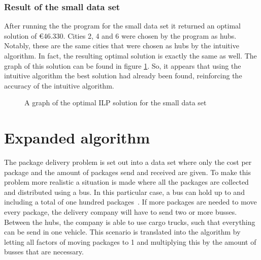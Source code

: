 \documentclass{article}
\begin{document}
\subsubsection{Result of the small data set}
After running the the program for the small data set it returned an optimal solution of €46.330. Cities 2, 4 and 6 were chosen by the program as hubs. Notably, these are the same cities that were chosen as hubs by the intuitive algorithm. In fact, the resulting optimal solution is exactly the same as well. The graph of this solution can be found in figure \ref{ILPSolSmall}. So, it appears that using the intuitive algorithm the best solution had already been found, reinforcing the accuracy of the intuitive algorithm.

\begin{figure}[h]

\centering
{}
\caption{A graph of the optimal ILP solution for the small data set}
\label{ILPSolSmall}
\end{figure}
\newpage

\section{Expanded algorithm}
The package delivery problem is set out into a data set where only the cost per package and the amount of packages send and received are given. To make this problem more realistic a situation is made where all the packages are collected and distributed using a bus. In this particular case, a bus can hold up to and including a total of one hundred packages~\cite{Packages per bus}. If more packages are needed to move every package, the delivery company will have to send two or more busses. Between the hubs, the company is able to use cargo trucks, such that everything can be send in one vehicle.
This scenario is translated into the algorithm by letting all factors of moving packages to 1 and multiplying this by the amount of busses that are necessary. 
\end{document}
